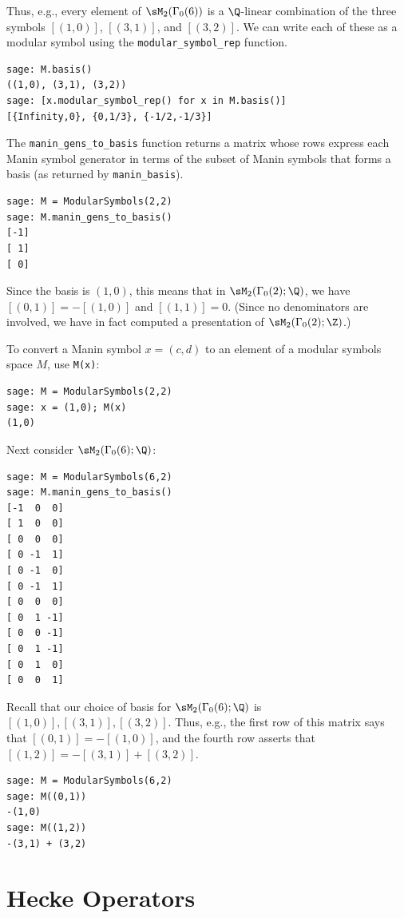 \begin{example}
Thus, e.g., every element of $\sM_2(\Gamma_0(6))$ is a $\Q$-linear
combination of the three symbols $[(1,0)]$, $[(3,1)]$, and $[(3,2)]$.
We can write each of these as a modular symbol using the 
{\tt modular\_symbol\_rep} function.

\begin{verbatim}
sage: M.basis()
((1,0), (3,1), (3,2))
sage: [x.modular_symbol_rep() for x in M.basis()]
[{Infinity,0}, {0,1/3}, {-1/2,-1/3}]
\end{verbatim}

The {\tt manin\_gens\_to\_basis} function returns a matrix
whose rows express each Manin symbol generator in terms
of the subset of Manin symbols that forms a basis (as
returned by {\tt manin\_basis}). 
\begin{verbatim}
sage: M = ModularSymbols(2,2)
sage: M.manin_gens_to_basis()
[-1]
[ 1]
[ 0]
\end{verbatim}
Since the basis is $(1,0)$, this 
means that in $\sM_2(\Gamma_0(2);\Q)$, we have
$[(0,1)] = -[(1,0)]$ and $[(1,1)] = 0$.
(Since no denominators are involved, we have in
fact computed a presentation of $\sM_2(\Gamma_0(2);\Z)$.)

To convert a Manin symbol $x=(c,d)$ to an element of a modular
symbols space $M$, use {\tt M(x)}:
\begin{verbatim}
sage: M = ModularSymbols(2,2)
sage: x = (1,0); M(x)
(1,0)
\end{verbatim}

Next consider $\sM_2(\Gamma_0(6);\Q)$:
\begin{verbatim}
sage: M = ModularSymbols(6,2)
sage: M.manin_gens_to_basis()
[-1  0  0]
[ 1  0  0]
[ 0  0  0]
[ 0 -1  1]
[ 0 -1  0]
[ 0 -1  1]
[ 0  0  0]
[ 0  1 -1]
[ 0  0 -1]
[ 0  1 -1]
[ 0  1  0]
[ 0  0  1]
\end{verbatim}
Recall that our choice of basis for 
$\sM_2(\Gamma_0(6);\Q)$ is $[(1,0)], [(3,1)], [(3,2)]$.
Thus, e.g., the first row of this matrix says that
$[(0,1)] = -[(1,0)]$, and the fourth row asserts
that 
$[(1,2)] = -[(3,1)] + [(3,2)]$. 
\begin{verbatim}
sage: M = ModularSymbols(6,2)
sage: M((0,1))
-(1,0)
sage: M((1,2))
-(3,1) + (3,2)
\end{verbatim}

\end{example}


\section{Hecke Operators}




